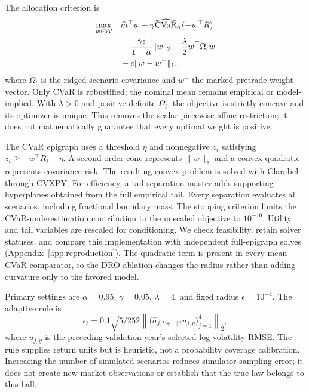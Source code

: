 The allocation criterion is
\begin{align}
\max_{w\in\mathcal{W}}\quad&\widehat m^\top w-\gamma\widehat{\operatorname{CVaR}}_\alpha(-w^\top R)\notag\\
&-\frac{\gamma\epsilon}{1-\alpha}\lVert w\rVert_2
-\frac\lambda2w^\top\Omega_t w\notag\\
&-c\lVert w-w^-\rVert_1,
\label{eq:allocation}
\end{align}
where $\Omega_t$ is the ridged scenario covariance and $w^-$ the marked pretrade weight vector. Only CVaR is robustified; the nominal mean remains empirical or model-implied. With $\lambda>0$ and positive-definite $\Omega_t$, the objective is strictly concave and its optimizer is unique. This removes the scalar piecewise-affine restriction; it does not mathematically guarantee that every optimal weight is positive.

The CVaR epigraph uses a threshold $\eta$ and nonnegative $z_i$ satisfying $z_i\geq-w^\top R_i-\eta$. A second-order cone represents $\lVert w\rVert_2$ and a convex quadratic represents covariance risk. The resulting convex problem is solved with Clarabel through CVXPY. For efficiency, a tail-separation master adds supporting hyperplanes obtained from the full empirical tail. Every separation evaluates all scenarios, including fractional boundary mass. The stopping criterion limits the CVaR-underestimation contribution to the unscaled objective to $10^{-10}$. Utility and tail variables are rescaled for conditioning. We check feasibility, retain solver statuses, and compare this implementation with independent full-epigraph solves (Appendix~\ref{app:reproduction}). The quadratic term is present in every mean--CVaR comparator, so the DRO ablation changes the radius rather than adding curvature only to the favored model.

Primary settings are $\alpha=0.95$, $\gamma=0.05$, $\lambda=4$, and fixed radius $\epsilon=10^{-4}$. The adaptive rule is
\begin{equation}
\epsilon_t=0.1\sqrt{5/252}\left\lVert
\bigl(\widehat\sigma_{j,t+1\mid t}u_{j,y}\bigr)_{j=1}^4
\right\rVert_2,
\end{equation}
where $u_{j,y}$ is the preceding validation year's selected log-volatility RMSE. The rule supplies return units but is heuristic, not a probability coverage calibration. Increasing the number of simulated scenarios reduces simulator sampling error; it does not create new market observations or establish that the true law belongs to this ball.

